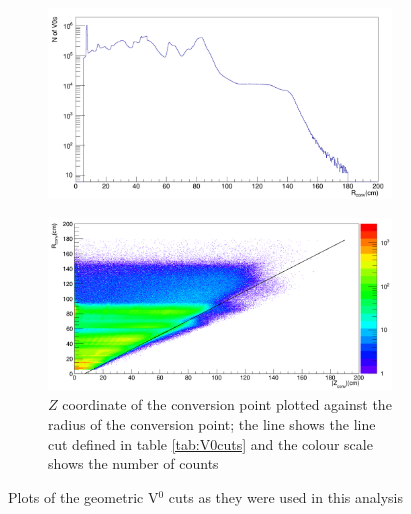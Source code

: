 \begin{figure}
\begin{subfigure}[h]{.4\linewidth}
\includegraphics[width=1.0\linewidth]{Figures/V0cuts/V0radius.png}
\caption{}
\label{fig:V0R}
\end{subfigure}\hspace{1cm}%
\begin{subfigure}[h]{.4\linewidth}
\includegraphics[width=1.0\linewidth]{Figures/V0cuts/V0RvsZwlinecut.png}
\caption{$Z$ coordinate of the conversion point plotted against the radius of the conversion point; the line shows the line cut defined in table \ref{tab:V0cuts} and the colour scale shows the number of counts}
\label{fig:V0linecut}
\end{subfigure}
\vspace{0.5cm}
\caption{Plots of the geometric V$^0$ cuts as they were used in this analysis}
\label{fig:V0cuts}
\end{figure}
